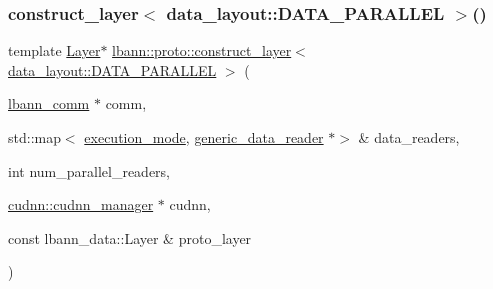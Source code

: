 \subsubsection{\texorpdfstring{construct\+\_\+layer$<$ data\+\_\+layout\+::\+D\+A\+T\+A\+\_\+\+P\+A\+R\+A\+L\+L\+E\+L $>$()}{construct\_layer< data\_layout::DATA\_PARALLEL >()}}
{\footnotesize\ttfamily template \hyperlink{classlbann_1_1Layer}{Layer}$\ast$ \hyperlink{namespacelbann_1_1proto_a7e4b0a66836712b1713ae4a121453cde}{lbann\+::proto\+::construct\+\_\+layer}$<$ \hyperlink{base_8hpp_a786677cbfb3f5677b4d84f3056eb08dba37d2a3465f7cbf4ab60f4e79944d0638}{data\+\_\+layout\+::\+D\+A\+T\+A\+\_\+\+P\+A\+R\+A\+L\+L\+EL} $>$ (\begin{DoxyParamCaption}\item[{\hyperlink{classlbann_1_1lbann__comm}{lbann\+\_\+comm} $\ast$}]{comm,  }\item[{std\+::map$<$ \hyperlink{base_8hpp_a2781a159088df64ed7d47cc91c4dc0a8}{execution\+\_\+mode}, \hyperlink{classlbann_1_1generic__data__reader}{generic\+\_\+data\+\_\+reader} $\ast$$>$ \&}]{data\+\_\+readers,  }\item[{int}]{num\+\_\+parallel\+\_\+readers,  }\item[{\hyperlink{classlbann_1_1cudnn_1_1cudnn__manager}{cudnn\+::cudnn\+\_\+manager} $\ast$}]{cudnn,  }\item[{const lbann\+\_\+data\+::\+Layer \&}]{proto\+\_\+layer }\end{DoxyParamCaption})}

\mbox{\label{namespacelbann_1_1proto_a36c1ccd8022c3a9708ea8e17f8ec2ee1}} 
